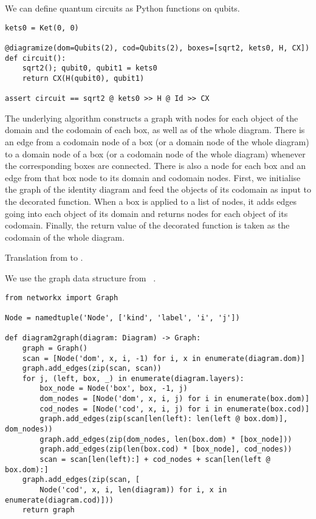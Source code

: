\begin{example}
We can define quantum circuits as Python functions on qubits.

\begin{verbatim}
kets0 = Ket(0, 0)

@diagramize(dom=Qubits(2), cod=Qubits(2), boxes=[sqrt2, kets0, H, CX])
def circuit():
    sqrt2(); qubit0, qubit1 = kets0
    return CX(H(qubit0), qubit1)

assert circuit == sqrt2 @ kets0 >> H @ Id >> CX
\end{verbatim}
\end{example}

The underlying algorithm constructs a graph with nodes for each object of the domain and the codomain of each box, as well as of the whole diagram.
There is an edge from a codomain node of a box (or a domain node of the whole diagram) to a domain node of a box (or a codomain node of the whole diagram) whenever the corresponding boxes are connected.
There is also a node for each box and an edge from that box node to its domain and codomain nodes.
First, we initialise the graph of the identity diagram and feed the objects of its codomain as input to the decorated function.
When a box is applied to a list of nodes, it adds edges going into each object of its domain and returns nodes for each object of its codomain.
Finally, the return value of the decorated function is taken as the codomain of the whole diagram.

\begin{python}\label{listing:diagram2graph}
{\normalfont Translation from  to .}

We use the graph data structure from ~\cite{HagbergEtAl08}.

\begin{verbatim}
from networkx import Graph

Node = namedtuple('Node', ['kind', 'label', 'i', 'j'])

def diagram2graph(diagram: Diagram) -> Graph:
    graph = Graph()
    scan = [Node('dom', x, i, -1) for i, x in enumerate(diagram.dom)]
    graph.add_edges(zip(scan, scan))
    for j, (left, box, _) in enumerate(diagram.layers):
        box_node = Node('box', box, -1, j)
        dom_nodes = [Node('dom', x, i, j) for i in enumerate(box.dom)]
        cod_nodes = [Node('cod', x, i, j) for i in enumerate(box.cod)]
        graph.add_edges(zip(scan[len(left): len(left @ box.dom)], dom_nodes))
        graph.add_edges(zip(dom_nodes, len(box.dom) * [box_node]))
        graph.add_edges(zip(len(box.cod) * [box_node], cod_nodes))
        scan = scan[len(left):] + cod_nodes + scan[len(left @ box.dom):]
    graph.add_edges(zip(scan, [
        Node('cod', x, i, len(diagram)) for i, x in enumerate(diagram.cod)]))
    return graph
\end{verbatim}
\end{python}

